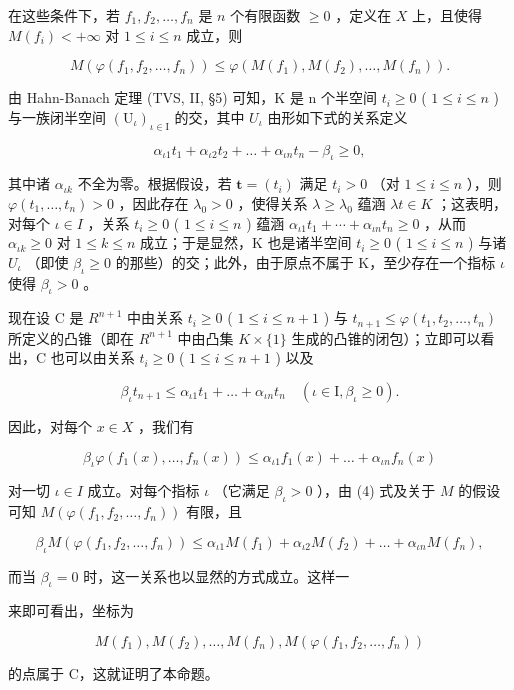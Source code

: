 在这些条件下，若 \(f_1, f_2, \ldots, f_n\) 是 \(n\) 个有限函数 \(\geqslant 0\) ，定义在 \(X\) 上，且使得 \(M(f_i) < +\infty\) 对 \(1 \leqslant i \leqslant n\) 成立，则

\[
M \left(\varphi \left(f _ {1}, f _ {2}, \dots , f _ {n}\right)\right) \leqslant \varphi \left(M \left(f _ {1}\right), M \left(f _ {2}\right), \dots , M \left(f _ {n}\right)\right).\tag{1}
\]

由 Hahn-Banach 定理 (TVS, II, §5) 可知，K 是 n 个半空间 \(t_{i} \geqslant 0\) ( \(1 \leqslant i \leqslant n\) ) 与一族闭半空间 \((\mathrm{U}_{\iota})_{\iota \in \mathrm{I}}\) 的交，其中 \(U_{\iota}\) 由形如下式的关系定义

\[
\alpha_ {\iota 1} t _ {1} + \alpha_ {\iota 2} t _ {2} + \dots + \alpha_ {\iota n} t _ {n} - \beta_ {\iota} \geqslant 0,\tag{2}
\]

其中诸 \(\alpha_{\iota k}\) 不全为零。根据假设，若 \(\mathbf{t}=(t_{i})\) 满足 \(t_{i}>0\) （对 \(1\leqslant i\leqslant n\) ），则 \(\varphi(t_{1},\ldots,t_{n})>0\) ，因此存在 \(\lambda_{0}>0\) ，使得关系 \(\lambda\geqslant\lambda_{0}\) 蕴涵 \(\lambda t\in K\) ；这表明，对每个 \(\iota\in I\) ，关系 \(t_{i}\geqslant0\) ( \(1\leqslant i\leqslant n\) ) 蕴涵 \(\alpha_{\iota1}t_{1}+\cdots+\alpha_{\iota n}t_{n}\geqslant0\) ，从而 \(\alpha_{\iota k}\geqslant0\) 对 \(1\leqslant k\leqslant n\) 成立；于是显然，K 也是诸半空间 \(t_{i}\geqslant0\) ( \(1\leqslant i\leqslant n\) ) 与诸 \(U_{\iota}\) （即使 \(\beta_{\iota}\geqslant0\) 的那些）的交；此外，由于原点不属于 K，至少存在一个指标 \(\iota\) 使得 \(\beta_{\iota}>0\) 。

现在设 C 是 \(R^{n+1}\) 中由关系 \(t_{i} \geqslant 0\) ( \(1 \leqslant i \leqslant n + 1\) ) 与 \(t_{n+1} \leqslant \varphi(t_{1}, t_{2}, \ldots, t_{n})\) 所定义的凸锥（即在 \(R^{n+1}\) 中由凸集 \(K \times \{1\}\) 生成的凸锥的闭包）；立即可以看出，C 也可以由关系 \(t_{i} \geqslant 0\) ( \(1 \leqslant i \leqslant n + 1\) ) 以及

\[
\beta_ {\iota} t _ {n + 1} \leqslant \alpha_ {\iota 1} t _ {1} + \dots + \alpha_ {\iota n} t _ {n} \quad (\iota \in \mathrm{I}, \beta_ {\iota} \geqslant 0).\tag{3}
\]

因此，对每个 \(x \in X\) ，我们有

\[
\beta_ {\iota} \varphi (f _ {1} (x), \dots , f _ {n} (x)) \leqslant \alpha_ {\iota 1} f _ {1} (x) + \dots + \alpha_ {\iota n} f _ {n} (x)\tag{4}
\]

对一切 \(\iota \in I\) 成立。对每个指标 \(\iota\) （它满足 \(\beta_{\iota} > 0\) ），由 (4) 式及关于 \(M\) 的假设可知 \(M(\varphi(f_1, f_2, \ldots, f_n))\) 有限，且

\[
\beta_ {\iota} M \left(\varphi \left(f _ {1}, f _ {2}, \dots , f _ {n}\right)\right) \leqslant \alpha_ {\iota 1} M \left(f _ {1}\right) + \alpha_ {\iota 2} M \left(f _ {2}\right) + \dots + \alpha_ {\iota n} M \left(f _ {n}\right),
\]

而当 \(\beta_{\iota} = 0\) 时，这一关系也以显然的方式成立。这样一

来即可看出，坐标为

\[
M (f _ {1}), M (f _ {2}), \dots , M (f _ {n}), M (\varphi (f _ {1}, f _ {2}, \dots , f _ {n}))
\]

的点属于 C，这就证明了本命题。

